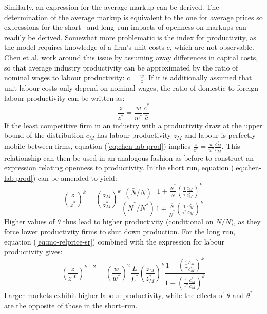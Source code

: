 Similarly, an expression for the average markup can be derived. The determination of the average markup is equivalent to the one for average prices so expressions for the short-- and long--run impacts of openness on markups can readily be derived. Somewhat more problematic is the index for productivity, as the model requires knowledge of a firm's unit costs $c$, which are not observable. Chen et al. work around this issue by assuming away differences in capital costs, so that average industry productivity can be approximated by the ratio of nominal wages to labour productivity: $\bar{c} = \frac{w}{z}$. If it is additionally assumed that unit labour costs only depend on nominal wages, the ratio of domestic to foreign labour productivity can be written as:
\begin{equation}\label{eq:chen-lab-prod}
\frac{z}{z^*} = \frac{w}{w^*} \frac{\bar{c}^*}{\bar{c}}
\end{equation}
If the least competitive firm in an industry with a productivity draw at the upper bound of the distribution $c_M$ has labour productivity $z_M$ and labour is perfectly mobile between firms, equation (\ref{eq:chen-lab-prod}) implies $\frac{z}{z^*} = \frac{w}{w^*} \frac{c_M^*}{c_M}$. This relationship can then be used in an analogous fashion as before to construct an expression relating openness to productivity. In the short run, equation (\ref{eq:chen-lab-prod}) can be amended to yield:
\begin{equation}\label{eq:chen-prod-sr}
\left( \frac{z}{z^*} \right)^k = \left( \frac{z_M}{z_M^*} \right)^k \frac{(\bar{N}/N)}{(\bar{N}^*/N^*)} \frac{1+ \frac{\bar{N}^*}{\bar{N}} \left(\frac{1}{\tau}\frac{c_M}{c_M^*}\right)^k}{1+ \frac{\bar{N}}{\bar{N}^*} \left(\frac{1}{\tau^*} \frac{c_M^*}{c_M}\right)^k} 
\end{equation}
Higher values of $\theta$ thus lead to higher productivity (conditional on $\bar{N}/N$), as they force lower productivity firms to shut down production. For the long run, equation (\ref{eq:mo-relprice-sr}) combined with the expression for labour productivity gives:
\begin{equation}\label{eq:chen-prod-lr}      
\left( \frac{z}{z*} \right)^{k+2} = \left( \frac{w}{w^*} \right)^2 \frac{L}{L^*} \left( \frac{z_M}{z_M^*} \right)^k \frac{1-\left(\frac{1}{\tau} \frac{c_M}{c_M^*}\right)^k}{1-\left(\frac{1}{\tau^*} \frac{c_M^*}{c_M}\right)^k}
\end{equation} 
Larger markets exhibit higher labour productivity, while the effects of $\theta$ and $\theta^*$ are the opposite of those in the short--run.

